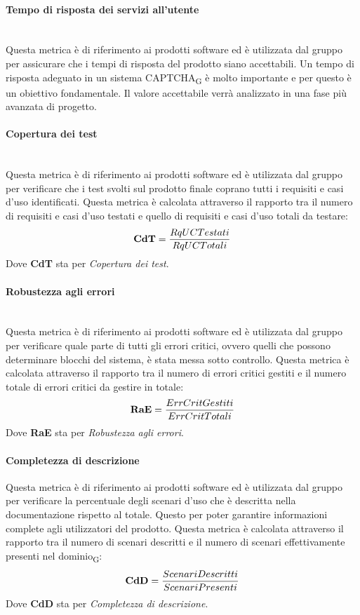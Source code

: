 \paragraph{Tempo di risposta dei servizi all'utente}\mbox{}\\
Questa metrica è di riferimento ai prodotti software ed è utilizzata dal gruppo per assicurare che i tempi di risposta del prodotto siano accettabili. Un tempo di risposta adeguato in un sistema CAPTCHA\textsubscript{G} è molto importante e per questo è un obiettivo fondamentale. Il valore accettabile verrà analizzato in una fase più avanzata di progetto.
\paragraph{Copertura dei test}\mbox{}\\
Questa metrica è di riferimento ai prodotti software ed è utilizzata dal gruppo per verificare che i test svolti sul prodotto finale coprano tutti i requisiti e casi d’uso identificati. Questa metrica è calcolata attraverso il rapporto tra il numero di requisiti e casi d'uso testati e quello di requisiti e casi d'uso totali da testare:
\begin{align*}
	\centering
	\textbf{CdT} = \frac{RqUCTestati}{RqUCTotali}
\end{align*}
Dove \textbf{CdT} sta per \textit{Copertura dei test}.
\paragraph{Robustezza agli errori}\mbox{}\\
Questa metrica è di riferimento ai prodotti software ed è utilizzata dal gruppo per verificare quale parte di tutti gli errori critici, ovvero quelli che possono determinare blocchi del sistema, è stata messa sotto controllo. Questa metrica è calcolata attraverso il rapporto tra il numero di errori critici gestiti e il numero totale di errori critici da gestire in totale:
\begin{align*}
	\centering
	\textbf{RaE} = \frac{ErrCritGestiti}{ErrCritTotali}
\end{align*}
Dove \textbf{RaE} sta per \textit{Robustezza agli errori}.
\newpage
\paragraph{Completezza di descrizione}\mbox\\
Questa metrica è di riferimento ai prodotti software ed è utilizzata dal gruppo per verificare la percentuale degli scenari d’uso che è descritta nella documentazione rispetto al totale. Questo per poter garantire informazioni complete agli utilizzatori del prodotto. Questa metrica è calcolata attraverso il rapporto tra il numero di scenari descritti e il numero di scenari effettivamente presenti nel dominio\textsubscript{G}:
\begin{align*}
	\centering
	\textbf{CdD} = \frac{ScenariDescritti}{ScenariPresenti}
\end{align*}
Dove \textbf{CdD} sta per \textit{Completezza di descrizione}.
